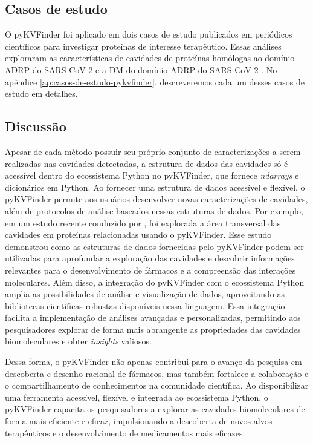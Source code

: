 \documentclass[Portugues]{phdquali}
\begin{document}
\subsection{Casos de estudo}

O pyKVFinder foi aplicado em dois casos de estudo publicados em periódicos científicos para investigar proteínas de interesse terapêutico. Essas análises exploraram as características de cavidades de proteínas homólogas ao domínio ADRP do SARS-CoV-2 e a DM do domínio ADRP do SARS-CoV-2 \cite{guerra2021}. No apêndice \ref{ap:casos-de-estudo-pykvfinder}, descreveremos cada um desses casos de estudo em detalhes.


\subsection{Discussão}

Apesar de cada método possuir seu próprio conjunto de caracterizações a serem realizadas nas cavidades detectadas, a estrutura de dados das cavidades só é acessível dentro do ecossistema Python no pyKVFinder, que fornece \textit{ndarrays} e dicionários em Python. Ao fornecer uma estrutura de dados acessível e flexível, o pyKVFinder permite aos usuários desenvolver novas caracterizações de cavidades, além de protocolos de análise baseados nessas estruturas de dados. Por exemplo, em um estudo recente conduzido por \cite{jefferson2023}, foi explorada a área transversal das cavidades em proteínas relacionadas usando o pyKVFinder. Esse estudo demonstrou como as estruturas de dados fornecidas pelo pyKVFinder podem ser utilizadas para aprofundar a exploração das cavidades e descobrir informações relevantes para o desenvolvimento de fármacos e a compreensão das interações moleculares. Além disso, a integração do pyKVFinder com o ecossistema Python amplia as possibilidades de análise e visualização de dados, aproveitando as bibliotecas científicas robustas disponíveis nessa linguagem. Essa integração facilita a implementação de análises avançadas e personalizadas, permitindo aos pesquisadores explorar de forma mais abrangente as propriedades das cavidades biomoleculares e obter \textit{insights} valiosos.

Dessa forma, o pyKVFinder não apenas contribui para o avanço da pesquisa em descoberta e desenho racional de fármacos, mas também fortalece a colaboração e o compartilhamento de conhecimentos na comunidade científica. Ao disponibilizar uma ferramenta acessível, flexível e integrada ao ecossistema Python, o pyKVFinder capacita os pesquisadores a explorar as cavidades biomoleculares de forma mais eficiente e eficaz, impulsionando a descoberta de novos alvos terapêuticos e o desenvolvimento de medicamentos mais eficazes.
\end{document}
